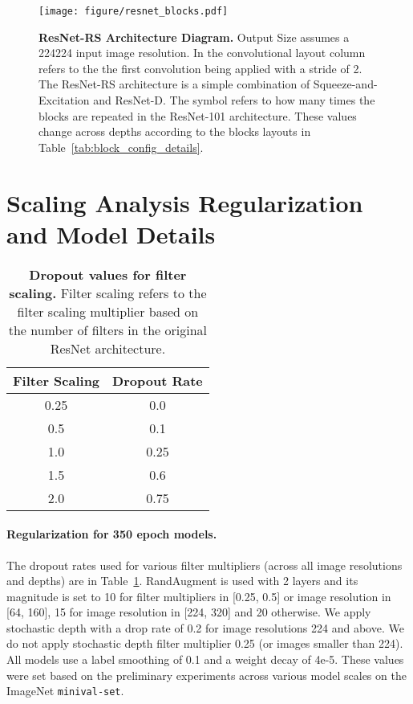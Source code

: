\documentclass{article}
\begin{document}
\begin{figure}[h!]
    \begin{center}
    \texttt{[image: figure/resnet\_blocks.pdf]}
    \end{center}
    \caption{\textbf{ResNet-RS Architecture Diagram.} Output Size assumes a 224224 input image resolution. In the convolutional layout column  refers to the the first  convolution being applied with a stride of 2. The ResNet-RS architecture is a simple combination of Squeeze-and-Excitation and ResNet-D. The  symbol refers to how many times the blocks are repeated in the ResNet-101 architecture. These values change across depths according to the blocks layouts in Table~\ref{tab:block_config_details}.}
    \label{fig:resnet_arch_diagram}
\end{figure}

\section{Scaling Analysis Regularization and Model Details}
\label{sec:reg_scheme_scaling}
\begin{table}[ht!]
\centering
\begin{tabular}{c|c}
  \toprule
  Filter Scaling  & Dropout Rate \\
  \hline
  0.25 & 0.0  \\
  0.5 & 0.1 \\
  1.0 & 0.25 \\
  1.5 & 0.6 \\
  2.0 & 0.75\\
  \bottomrule
\end{tabular}
\caption{\textbf{Dropout values for filter scaling.} Filter scaling refers to the filter scaling multiplier based on the number of filters in the original ResNet architecture. }
\label{tab:dropout_scaling_values} 
\end{table}

\paragraph{Regularization for 350 epoch models.} 
The dropout rates used for various filter multipliers (across all image resolutions and depths) are in Table~\ref{tab:dropout_scaling_values}. 
RandAugment is used with 2 layers and its magnitude is set to 10 for filter multipliers in [0.25, 0.5] or image resolution in [64, 160], 15 for image resolution in [224, 320] and 20 otherwise.
We apply stochastic depth with a drop rate of 0.2 for image resolutions 224 and above.
We do not apply stochastic depth filter multiplier 0.25 (or images smaller than 224).
All models use a label smoothing of 0.1 and a weight decay of 4e-5. 
These values were set based on the preliminary experiments across various model scales on the ImageNet \texttt{minival-set}.
\end{document}
